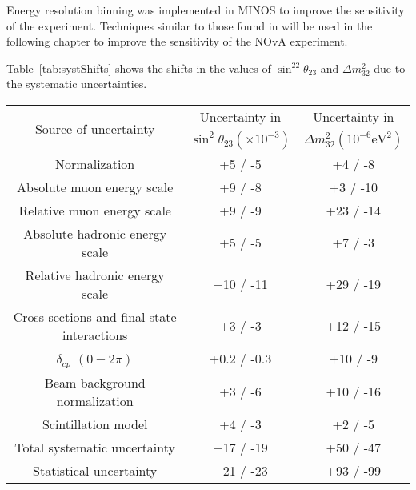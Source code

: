 
Energy resolution binning was implemented in MINOS to improve the
sensitivity of the experiment. Techniques similar to those found in
\cite{Marshall} will be used in the following chapter to improve the
sensitivity of the NOvA experiment. 


Table~\ref{tab:systShifts} shows the shifts in the values of
$\sin^22\theta_{23}$ and $\Delta m^2_{32}$ due to the systematic
uncertainties. 


\begin{table*}[t]
\caption{
\textcolor{red}{\textbf{Following copied from the NuMu SA paper: }
Sources of uncertainty and their estimated average impact on
$\sin^2\theta_{23}$ and $\Delta m^2_{32}$. Systematic uncertainties
are included in a fit to simulated data one at a time via their
associated penalty terms. The increase in the one-dimension
68\%~C.L. interval relative to when only statistical fluctuations are
included in the fit is used to estimate the average impact of
individual systematic uncertainties. The estimate is obtained by
subtracting the 68\%~C.L. intervals in quadrature, except for the
effect of $\delta_{cp}$, where the absolute difference in the size of
the intervals is used. The total impact of all sources of systematic
uncertainty is obtained by including all systematics in the fit
simultaneously, and then adding the effect of $\delta_{cp}$. Simulated
data were oscillated with $\Delta
m^2_{32}=2.66\mathord{\times}10^{-3}\text{~eV}^{2}$ and
$\sin^2\theta_{23}=0.626$.}   
}
\begin{tabular}{c c c}
\hline 
\multirow{2}{*}{Source of uncertainty} & Uncertainty in & Uncertainty in \\
& $\sin^2\!\theta_{23} (\times 10^{-3})$ & $\Delta m^2_{32}
                                           \left(10^{-6}\text{
                                           eV}^{2}\right)$ \\ 
\hline 
Normalization & +5 /  -5 & +4 / -8 \\
Absolute muon energy scale & +9 /  -8 & +3 /  -10\\
Relative muon energy scale & +9 /  -9 & +23 /  -14\\
Absolute hadronic energy scale & +5 /  -5 & +7 /  -3\\
Relative hadronic energy scale & +10 / -11 & +29 /  -19\\
Cross sections and final state interactions & +3 /  -3  & +12 /  -15 \\ 
$\delta_{cp}$ $(0 - 2\pi)$ & +0.2 / -0.3 & +10 /  -9 \\
Beam background normalization & +3 /  -6 & +10 /  -16 \\ 
Scintillation model & +4 /  -3   & +2 / -5 \\
\hline 
Total systematic uncertainty & +17 / -19 & +50 / -47 \\
\hline
Statistical uncertainty & +21 /  -23 & +93 /  -99  \\
\hline
\end{tabular}
\label{tab:systShifts}
\end{table*}


